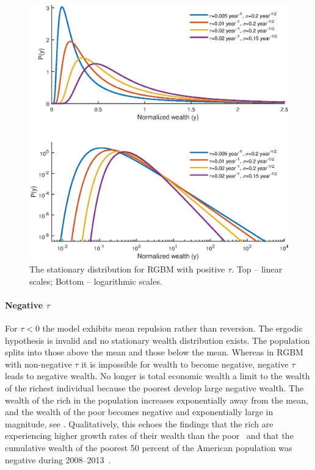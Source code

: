 \begin{figure}[!htb]
\centering
\includegraphics[width=1.0\textwidth] {./chapter_3/figs/dists.eps}
\caption{The stationary distribution for RGBM with positive $\tau$. Top -- linear scales; Bottom -- logarithmic scales.}
\end{figure}

\paragraph{Negative $\tau$}

For $\tau<0$ the model exhibits mean repulsion rather than reversion. The ergodic hypothesis is invalid and no stationary wealth distribution exists. The population splits into those above the mean and those below the mean. Whereas in RGBM with non-negative $\tau$ it is impossible for wealth to become negative, negative $\tau$ leads to negative wealth. No longer is total economic wealth a limit to the wealth of the richest individual because the poorest develop large negative wealth. The wealth of the rich in the population increases exponentially away from the mean, and the wealth of the poor becomes negative and exponentially large in magnitude, see . Qualitatively, this echoes the findings that the rich are experiencing higher growth rates of their wealth than the poor~\cite{Piketty2014,wolff2014household} and that the cumulative wealth of the poorest 50 percent of the American population was negative during 2008--2013~\cite{Rios20162013,WID2017}.

